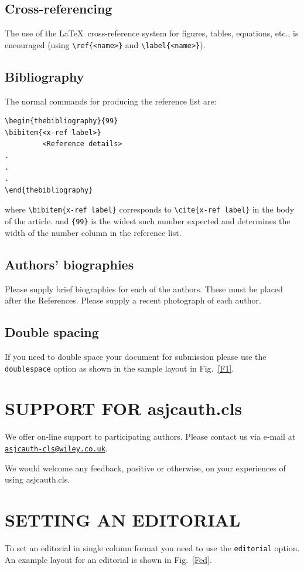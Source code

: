 \documentclass[times]{asjcauth}
\begin{document}
\subsection{Cross-referencing}
The use of the \LaTeX\ cross-reference system
for figures, tables, equations, etc., is encouraged
(using \verb"\ref{<name>}" and \verb"\label{<name>}").

\subsection{Bibliography}
The normal commands for producing the reference list are:
\begin{verbatim}
\begin{thebibliography}{99}
\bibitem{<x-ref label>}
         <Reference details>
.
.
.
\end{thebibliography}
\end{verbatim}
where \verb"\bibitem{x-ref label}"
corresponds to \verb"\cite{x-ref label}" in the body of the article.
and \verb"{99}" is the widest such number expected and determines
the width of the number column in the reference list.

\subsection{Authors' biographies}
Please supply brief biographies for each of the authors. These
must be placed after the References. Please supply a recent
photograph of each author.

\subsection{Double spacing}
If you need to double space your document for submission please
use the \verb+doublespace+ option as shown in the sample layout in
Fig.~\ref{F1}.

\section{SUPPORT FOR \textsf{asjcauth.cls}}
We offer on-line support to participating authors. Please contact
us via e-mail at\\
\href{mailto:asjcauth-cls@wiley.co.uk}{\texttt{asjcauth-cls@wiley.co.uk}}.

We would welcome any feedback, positive or otherwise, on your
experiences of using \textsf{asjcauth.cls}.

\section{SETTING AN EDITORIAL}
To set an editorial in single column format you need to use the
\verb+editorial+ option. An example layout for an editorial is shown in
Fig.~\ref{Fed}.
\end{document}
